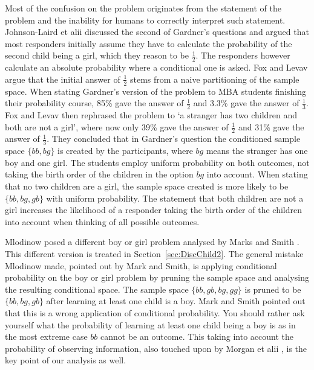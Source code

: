 \documentclass[a4paper]{report}
\theoremstyle{plain}
\theoremstyle{definition}
\theoremstyle{remark}
\numberwithin{equation}{chapter}
\DeclareMathOperator{\1}{\mathbbm{1}}
\begin{document}
Most of the confusion on the problem originates from the statement of the problem and the inability for humans to correctly interpret such statement. Johnson-Laird et alii \cite{Laird99} discussed the second of Gardner's questions and argued that most responders initially assume they have to calculate the probability of the second child being a girl, which they reason to be $\frac{1}{2}$. The responders however calculate an absolute probability where a conditional one is asked. Fox and Levav \cite{Fox04} argue that the initial answer of $\frac{1}{2}$ stems from a naive partitioning of the sample space. When stating Gardner's version of the problem to MBA students finishing their probability course, 85\% gave the answer of $\frac{1}{2}$ and 3.3\% gave the answer of $\frac{1}{3}$. Fox and Levav then rephrased the problem to `a stranger has two children and both are not a girl', where now only 39\% gave the answer of $\frac{1}{2}$ and 31\% gave the answer of $\frac{1}{3}$. They concluded that in Gardner's question the conditioned sample space $\{bb,bg\}$ is created by the participants, where $bg$ means the stranger has one boy and one girl. The students employ uniform probability on both outcomes, not taking the birth order of the children in the option $bg$ into account. When stating that no two children are a girl, the sample space created is more likely to be $\{bb,bg,gb\}$ with uniform probability. The statement that both children are not a girl increases the likelihood of a responder taking the birth order of the children into account when thinking of all possible outcomes.

Mlodinow \cite{Mlodinow09} posed a different boy or girl problem analysed by Marks and Smith \cite{Marks11}. This different version is treated in Section~\ref{sec:DiscChild2}. The general mistake Mlodinow made, pointed out by Mark and Smith, is applying conditional probability on the boy or girl problem by pruning the sample space and analysing the resulting conditional space. The sample space $\{bb,gb,bg,gg\}$ is pruned to be $\{bb,bg,gb\}$ after learning at least one child is a boy. Mark and Smith pointed out that this is a wrong application of conditional probability. You should rather ask yourself what the probability of learning at least one child being a boy is as in the most extreme case $bb$ cannot be an outcome. This taking into account the probability of observing information, also touched upon by Morgan et alii \cite{Morgan91a}, is the key point of our analysis as well.
\end{document}
